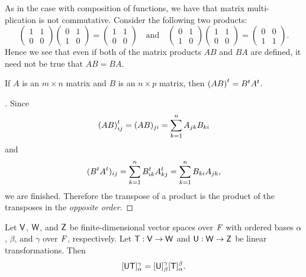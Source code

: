 \begin{note}
  As in the case with composition of functions, we have that matrix multi- plication is not commutative. Consider the following two products:
  \[
    \begin{pmatrix}
      1 & 1 \\
      0 & 0
    \end{pmatrix} \begin{pmatrix}
      0 & 1 \\
      1 & 0
    \end{pmatrix} = \begin{pmatrix}
      1 & 1 \\
      0 & 0
    \end{pmatrix} \quad \text{and} \quad \begin{pmatrix}
      0 & 1 \\
      1 & 0
    \end{pmatrix} \begin{pmatrix}
      1 & 1 \\
      0 & 0
    \end{pmatrix} = \begin{pmatrix}
      0 & 0 \\
      1 & 1
    \end{pmatrix}.
  \]
  Hence we see that even if both of the matrix products \(AB\) and \(BA\) are defined, it need not be true that \(AB = BA\).
\end{note}

\begin{eg}\label{2.3.2}
  If \(A\) is an \(m \times n\) matrix and \(B\) is an \(n \times p\) matrix, then \({(AB)}^{t} = {B}^{t} {A}^{t}\).
\end{eg}

\begin{proof}[]
  Since
  \[
    {(AB)}^{t}_{i j} = (AB)_{j i} = \sum_{k = 1}^n A_{j k} B_{k i}
  \]
  and
  \[
    ({B}^{t} {A}^{t})_{i j} = \sum_{k = 1}^n {B}^{t}_{i k} {A}^{t}_{k j} = \sum_{k = 1}^n B_{k i} A_{j k},
  \]
  we are finished.
  Therefore the transpose of a product is the product of the transposes in the \emph{opposite order}.
\end{proof}

\begin{thm}\label{2.11}
  Let \(\mathsf{V}\), \(\mathsf{W}\), and \(\mathsf{Z}\) be finite-dimensional vector spaces over \(\mathit{F}\) with ordered bases \(\alpha\), \(\beta\), and \(\gamma\) over \(\mathit{F}\), respectively.
  Let \(\mathsf{T} : \mathsf{V} \to \mathsf{W}\) and \(\mathsf{U} : \mathsf{W} \to \mathsf{Z}\) be linear transformations.
  Then
  \[
    [\mathsf{U} \mathsf{T}]_{\alpha}^{\gamma} = [\mathsf{U}]_{\beta}^{\gamma} [\mathsf{T}]_{\alpha}^{\beta}.
  \]
\end{thm}

